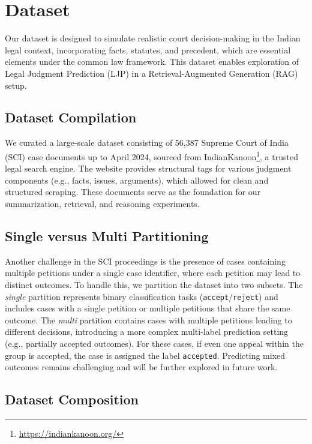 \section{Dataset}
\label{sec:dataset}
Our dataset is designed to simulate realistic court decision-making in the Indian legal context, incorporating facts, statutes, and precedent, which are essential elements under the common law framework. This dataset enables exploration of Legal Judgment Prediction (LJP) in a Retrieval-Augmented Generation (RAG) setup.

\subsection{Dataset Compilation}

We curated a large-scale dataset consisting of 56,387 Supreme Court of India (SCI) case documents up to April 2024, sourced from IndianKanoon\footnote{\url{https://indiankanoon.org/}}, a trusted legal search engine. The website provides structural tags for various judgment components (e.g., facts, issues, arguments), which allowed for clean and structured scraping. These documents serve as the foundation for our summarization, retrieval, and reasoning experiments.

\subsection{Single versus Multi Partitioning}

Another challenge in the SCI proceedings is the presence of cases containing multiple petitions under a single case identifier, where each petition may lead to distinct outcomes. To handle this, we partition the dataset into two subsets. The \textit{single} partition represents binary classification tasks (\texttt{accept}/\texttt{reject}) and includes cases with a single petition or multiple petitions that share the same outcome. The \textit{multi} partition
contains cases with multiple petitions leading to different decisions, introducing a more complex multi-label prediction setting (e.g., partially accepted outcomes). For these cases, if even one appeal within the group is accepted, the case is assigned the label \texttt{accepted}. Predicting mixed outcomes remains challenging and will be further explored in future work.

\subsection{Dataset Composition}

